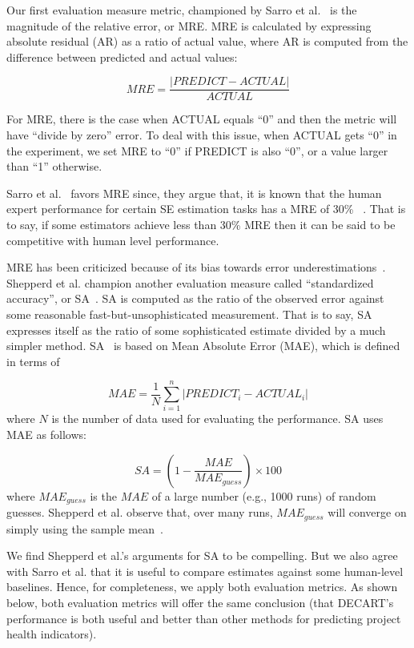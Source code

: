 \documentclass[sigconf,anonymous,review]{acmart}
\begin{document}
Our first evaluation measure metric, championed by  Sarro et al.~\cite{sarro2016multi} is the magnitude of the relative error, or MRE. MRE is calculated by expressing absolute residual (AR) as a ratio of actual value, where AR is computed from the difference between predicted and actual values:

\[
\mathit{MRE} = \frac{|\mathit{PREDICT} - \mathit{ACTUAL}|}{\mathit{ACTUAL}}
\]

For MRE, there is the case when ACTUAL equals ``0'' and then the metric will have ``divide by zero'' error. To deal with this issue, when ACTUAL gets ``0'' in the experiment, we set MRE to ``0'' if PREDICT is also ``0'', or a value larger than ``1'' otherwise.

Sarro et al.~\cite{sarro2016multi} favors MRE
since, they argue that, it is known that the human expert performance
for certain SE estimation tasks  has a MRE of 30\% ~\cite{molokken2003review}. That is to say, if some estimators achieve less than 30\% MRE then it can be said to be competitive with human level performance.  




MRE has been criticized because of its bias towards error underestimations~\cite{foss2003simulation,kitchenham2001accuracy,korte2008confidence,port2008comparative,shepperd2000building,stensrud2003further}.  
Shepperd et al. champion another evaluation measure called ``standardized accuracy'', or SA~\cite{shepperd2012evaluating}.
SA is computed as the ratio of the observed error against some reasonable fast-but-unsophisticated measurement. That is to say, 
SA expresses itself as the ratio of some sophisticated estimate
divided by a much simpler method.
SA~\cite{langdon2016exact,shepperd2012evaluating} is based on Mean Absolute Error (MAE), which is defined in terms of 

\[
\mathit{MAE}=\frac{1}{N}\sum_{i=1}^n|\mathit{PREDICT}_i-\mathit{ACTUAL}_i|
\]
where $N$ is the number of data used for evaluating the performance. SA uses MAE as follows:

\[
\mathit{SA} = (1-\frac{\mathit{MAE}}{\mathit{MAE}_{guess}})\times 100
\]
where $\mathit{MAE}_{guess}$ is the $\mathit{MAE}$ of a large number (e.g., 1000 runs) of random guesses. 
  Shepperd et al. observe that, over many runs,  $\mathit{MAE}_{guess}$ will converge on simply using the sample mean~\cite{shepperd2012evaluating}. 

We find Shepperd et al.'s arguments for SA to be compelling. But we also agree with Sarro et al. that it is useful to   compare estimates against some human-level baselines. Hence, for completeness, we apply both evaluation metrics. As shown below, both evaluation metrics will offer the same conclusion (that DECART's performance is both useful and better than other  methods for predicting project health indicators).
\end{document}
